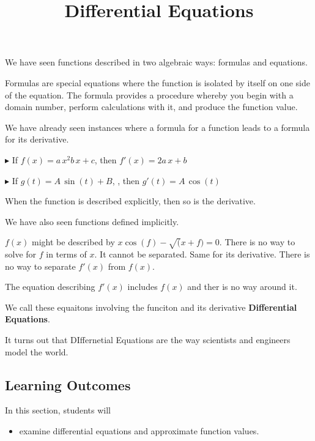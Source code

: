 \documentclass{ximera}
\title{Differential Equations}
\begin{document}
\begin{abstract}
\end{abstract}
\maketitle




We have seen functions described in two algebraic ways: formulas and equations.


Formulas are special equations where the function is isolated by itself on one side of the equation.  The formula provides a procedure whereby you begin with a domain number, perform calculations with it, and produce the function value.

We have already seen instances where a formula for a function leads to a formula for its derivative. 

$\blacktriangleright$ If $f(x) = a \, x^2  b \, x + c$, then $f'(x) = 2a \, x + b$

$\blacktriangleright$ If $g(t) = A \, \sin(t) + B$, , then $g'(t) = A \, \cos(t)$


When the function is described explicitly, then so is the derivative.


We have also seen functions defined implicitly.


$f(x)$ might be described by $x \cos(f) - \sqrt(x + f) = 0$.  There is no way to solve for $f$ in terms of $x$. It cannot be separated.  Same for its derivative. There is no way to separate $f'(x)$ from $f(x)$.

The equation describing $f'(x)$ includes $f(x)$ and ther is no way around it.


We call these equaitons involving the funciton and its derivative \textbf{Differential Equations}.

It turns out that DIffernetial Equations are the way scientists and engineers model the world.










\subsection{Learning Outcomes}


\begin{sectionOutcomes}
In this section, students will 

\begin{itemize}
\item examine differential equations and approximate function values.
\end{itemize}
\end{sectionOutcomes}
\end{document}
